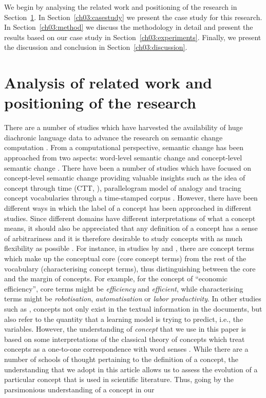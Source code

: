 \documentclass[output=paper]{langsci/langscibook}
\begin{document}
We begin by analysing the related work and positioning of the research in Section~\ref{ch03:relwork}. In Section~\ref{ch03:casestudy} we present the case study for this research. In Section~\ref{ch03:method} we discuss the methodology in detail and present the results based on our case study in Section~\ref{ch03:experiments}. Finally, we present the discussion and conclusion in Section~\ref{ch03:discussion}.

\section{Analysis of related work and positioning of the research}\label{ch03:relwork}
There are a number of studies which have harvested the availability of huge diachronic language data to advance the research on semantic change computation \citep{sagi-etal-2009-semantic, michel2011quantitative, rohrdantz2011towards, jatowt:2014:fas:2740769.2740809, mitra2015automatic, frermann-lapata-2016-bayesian, hamilton-etal-2016-diachronic, tang2016,dubossarsky-etal-2017-outta}. From a computational perspective, semantic change has been approached from two aspects: word-level semantic change and concept-level semantic change \citep{tahmasebi2018survey}. There have been a number of studies which have focused on concept-level semantic change providing valuable insights such as the idea of concept through time (CTT, \citealt{wevers2015concepts}), parallelogram model of analogy \citep{orlikowski-etal-2018-learning} and tracing concept vocabularies through a time-stamped corpus \citep{kenter2015ad, recchia2016tracing}. However, there have been different ways in which the label of a concept has been approached in different studies. Since different domains have different interpretations of what a concept means, it should also be appreciated that any definition of a concept has a sense of arbitrariness and it is therefore desirable to study concepts with as much flexibility as possible \citep{fokkens2016semantics}. For instance, in studies by \citet{kenter2015ad} and \citet{orlikowski-etal-2018-learning}, there are concept terms which make up the conceptual core (core concept terms) from the rest of the vocabulary (characterising concept terms), thus distinguishing between the core and the margin of concepts. For example, for the concept of ``economic efficiency'', core terms might be \emph{efficiency} and \emph{efficient}, while characterising terms might be \emph{robotisation}, \emph{automatisation} or \emph{labor productivity}. In other studies such as \citet{wang2011concept}, concepts not only exist in the textual information in the documents, but also refer to the quantity that a learning model is trying to predict, i.e., the variables. However, the understanding of \emph{concept} that we use in this paper is based on some interpretations of the classical theory of concepts which treat concepts as a one-to-one correspondence with word senses \citep{sep-concepts}. While there are a number of schools of thought pertaining to the definition of a concept, the understanding that we adopt in this article allows us to assess the evolution of a particular concept that is used in scientific literature. Thus, going by the parsimonious understanding of a concept in our 
\end{document}
